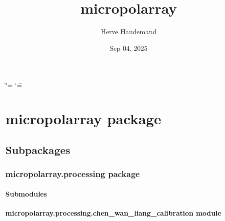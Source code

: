 \documentclass[letterpaper,10pt,english]{sphinxmanual}
\title{micropolarray}
\date{Sep 04, 2025}
\author{Herve Haudemand}
\begin{document}
\ifdefined\shorthandoff
  \ifnum\catcode`\=\string=\active\shorthandoff{=}\fi
  \ifnum\catcode`\"=\active{}\fi
\fi

\pagestyle{empty}
\sphinxmaketitle
\pagestyle{plain}
\sphinxtableofcontents
\pagestyle{normal}
\label{\detokenize{index::doc}}


\sphinxstepscope


\chapter{micropolarray package}
\label{\detokenize{micropolarray:micropolarray-package}}\label{\detokenize{micropolarray::doc}}

\section{Subpackages}
\label{\detokenize{micropolarray:subpackages}}
\sphinxstepscope


\subsection{micropolarray.processing package}
\label{\detokenize{micropolarray.processing:micropolarray-processing-package}}\label{\detokenize{micropolarray.processing::doc}}

\subsubsection{Submodules}
\label{\detokenize{micropolarray.processing:submodules}}

\subsubsection{micropolarray.processing.chen\_wan\_liang\_calibration module}
\label{\detokenize{micropolarray.processing:module-micropolarray.processing.chen_wan_liang_calibration}}\label{\detokenize{micropolarray.processing:micropolarray-processing-chen-wan-liang-calibration-module}}
\end{document}
